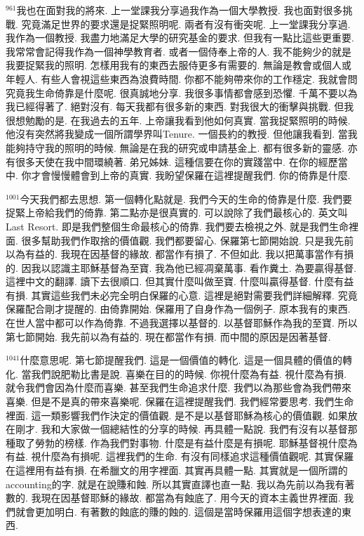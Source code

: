 \documentclass{book}
\begin{document}
$^{961}$我也在面對我的將來.
上一堂課我分享過我作為一個大學教授.
我也面對很多挑戰.
究竟滿足世界的要求還是捉緊照明呢.
兩者有沒有衝突呢.
上一堂課我分享過.
我作為一個教授.
我盡力地滿足大學的研究基金的要求.
但我有一點比這些更重要.
我常常會記得我作為一個神學教育者.
或者一個侍奉上帝的人.
我不能夠少的就是我要捉緊我的照明.
怎樣用我有的東西去服侍更多有需要的.
無論是教會或個人或年輕人.
有些人會視這些東西為浪費時間.
你都不能夠帶來你的工作穩定.
我就會問究竟我生命倚靠是什麼呢.
很真誠地分享.
我很多事情都會感到恐懼.
千萬不要以為我已經得著了.
絕對沒有.
每天我都有很多新的東西.
對我很大的衝擊與挑戰.
但我很想勉勵的是.
在我過去的五年.
上帝讓我看到他如何真實.
當我捉緊照明的時候.
他沒有突然將我變成一個所謂學界叫Tenure.
一個長約的教授.
但他讓我看到.
當我能夠持守我的照明的時候.
無論是在我的研究或申請基金上.
都有很多新的靈感.
亦有很多天使在我中間環繞著.
弟兄姊妹.
這種信要在你的實踐當中.
在你的經歷當中.
你才會慢慢體會到上帝的真實.
我盼望保羅在這裡提醒我們.
你的倚靠是什麼.

$^{1001}$今天我們都去思想.
第一個轉化點就是.
我們今天的生命的倚靠是什麼.
我們要捉緊上帝給我們的倚靠.
第二點亦是很真實的.
可以說除了我們最核心的.
英文叫Last Resort.
即是我們整個生命最核心的倚靠.
我們要去檢視之外.
就是我們生命裡面.
很多幫助我們作取捨的價值觀.
我們都要留心.
保羅第七節開始說.
只是我先前以為有益的.
我現在因基督的緣故.
都當作有損了.
不但如此.
我以把萬事當作有損的.
因我以認識主耶穌基督為至寶.
我為他已經凋棄萬事.
看作糞土.
為要贏得基督.
這裡中文的翻譯.
讀下去很順口.
但其實什麼叫做至寶.
什麼叫贏得基督.
什麼有益有損.
其實這些我們未必完全明白保羅的心意.
這裡是絕對需要我們詳細解釋.
究竟保羅配合剛才提醒的.
由倚靠開始.
保羅用了自身作為一個例子.
原本我有的東西.
在世人當中都可以作為倚靠.
不過我選擇以基督的.
以基督耶穌作為我的至寶.
所以第七節開始.
我先前以為有益的.
現在都當作有損.
而中間的原因是因著基督.

$^{1041}$什麼意思呢.
第七節提醒我們.
這是一個價值的轉化.
這是一個具體的價值的轉化.
當我們說肥勒比書是說.
喜樂在目的的時候.
你視什麼為有益.
視什麼為有損.
就令我們會因為什麼而喜樂.
甚至我們生命追求什麼.
我們以為那些會為我們帶來喜樂.
但是不是真的帶來喜樂呢.
保羅在這裡提醒我們.
我們經常要思考.
我們生命裡面.
這一類影響我們作決定的價值觀.
是不是以基督耶穌為核心的價值觀.
如果放在剛才.
我和大家做一個總結性的分享的時候.
再具體一點說.
我們有沒有以基督那種取了勞勃的榜樣.
作為我們對事物.
什麼是有益什麼是有損呢.
耶穌基督視什麼為有益.
視什麼為有損呢.
這裡我們的生命.
有沒有同樣追求這種價值觀呢.
其實保羅在這裡用有益有損.
在希臘文的用字裡面.
其實再具體一點.
其實就是一個所謂的accounting的字.
就是在說賺和蝕.
所以其實直譯也直一點.
我以為先前以為我有著數的.
我現在因基督耶穌的緣故.
都當為有蝕底了.
用今天的資本主義世界裡面.
我們就會更加明白.
有著數的蝕底的賺的蝕的.
這個是當時保羅用這個字想表達的東西.
\end{document}
